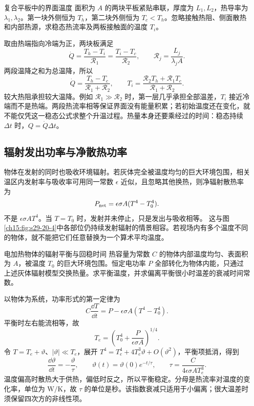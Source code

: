 {\Needspace{180pt}
\begin{origexamplebox}{复合平板中的界面温度}\label{ch15:ex:teaching-conduction}
面积为 $A$ 的两块平板紧贴串联，厚度为 $L_1,L_2$，热导率为 $\lambda_1,\lambda_2$。第一块外侧恒为 $T_h$，第二块外侧恒为 $T_c<T_h$。忽略接触热阻、侧面散热和内部热源，求稳态热流率及两板接触面的温度 $T_i$。

\ThQConduction
\end{origexamplebox}
\Needspace{65pt}
\begin{xesolution}
\ThAConduction

取由热端指向冷端为正，两块板满足
\[
 \dot Q=\frac{T_h-T_i}{\mathcal R_1}
       =\frac{T_i-T_c}{\mathcal R_2},\qquad
 \mathcal R_j=\frac{L_j}{\lambda_jA}.
\]
两段温降之和为总温降，所以
\[
 \dot Q=\frac{T_h-T_c}{\mathcal R_1+\mathcal R_2},\qquad
 T_i=\frac{\mathcal R_2T_h+\mathcal R_1T_c}{\mathcal R_1+\mathcal R_2}.
\]
较大热阻承担较大温降。例如 $\mathcal R_1\gg\mathcal R_2$ 时，第一层几乎承担全部温差，$T_i$ 接近冷端而不是热端。两段热流率相等保证界面没有能量积累；若初始温度还在变化，就不能仅凭这一稳态公式求整个升温过程。热量本身还要乘经过的时间：稳态持续 $\Delta t$ 时，$Q=\dot Q\Delta t$。
\end{xesolution}

\subsection{辐射发出功率与净散热功率}
物体在发射的同时也吸收环境辐射。若灰体完全被温度均匀的巨大环境包围，相关温区内发射率与吸收率可用同一常数 $\epsilon$ 近似，且忽略其他换热，则净辐射散热率为
\[
 P_{\rm net}=\epsilon\sigma A(T^4-T_0^4).
\]
不是 $\epsilon\sigma AT^4$。当 $T=T_0$ 时，发射并未停止，只是发出与吸收相等。
这与图\ref{ch15:fig:s29-20-4}中各部位仍持续发射辐射的情景相容。若视场内有多个温度不同的物体，就不能把它们任意替换为一个算术平均温度。

\Needspace{180pt}
\begin{origexamplebox}{电加热物体的辐射平衡与回稳时间}\label{ch15:ex:teaching-radiation}
热容量为常数 $C$ 的物体内部温度均匀、表面积为 $A$，被温度 $T_0$ 的巨大环境包围。恒定电功率 $P$ 全部转化为物体内能，只通过上述灰体辐射模型交换热量。求平衡温度，并求偏离平衡很小时温差的衰减时间常数。

\ThQRadiation
\end{origexamplebox}
\Needspace{65pt}
\begin{xesolution}
\ThARadiation

以物体为系统，功率形式的第一定律为
\[
 C\frac{\dd T}{\dd t}=P-\epsilon\sigma A(T^4-T_0^4).
\]
平衡时左右能流相等，故
\[
 T_e=\left(T_0^4+\frac{P}{\epsilon\sigma A}\right)^{1/4}.
\]
令 $T=T_e+\vartheta$、$|\vartheta|\ll T_e$，展开 $T^4=T_e^4+4T_e^3\vartheta+O(\vartheta^2)$，平衡项抵消，得到
\[
 \frac{\dd\vartheta}{\dd t}=-\frac{\vartheta}{\tau},\qquad
 \vartheta(t)=\vartheta(0)e^{-t/\tau},\qquad
 \tau=\frac{C}{4\epsilon\sigma AT_e^3}.
\]
温度偏高时散热大于供热，偏低时反之，所以平衡稳定。分母是热流率对温度的变化率，单位为 $\mathrm{W/K}$，故 $\tau$ 的单位是秒。该指数衰减只适用于小偏离；很大温差时须保留四次方的非线性项。
\end{xesolution}

}
